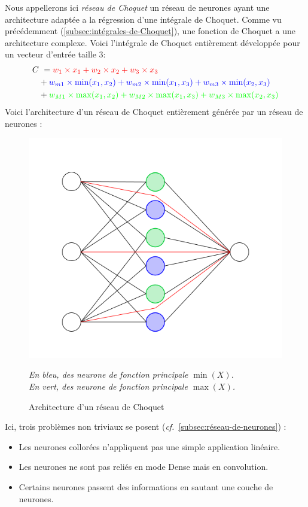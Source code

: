 Nous appellerons ici \emph{réseau de Choquet} un réseau de neurones ayant une architecture
adaptée a la régression d'une intégrale de Choquet.
Comme vu précédemment (\ref{subsec:intégrales-de-Choquet}),
une fonction de Choquet a une architecture complexe.
Voici l'intégrale de Choquet entièrement développée pour un vecteur d'entrée taille $3$:
\begin{align*}
    C&\ =
    \color{red}
    w_1 \times x_1 + w_2 \times x_2 + w_3 \times x_3 \\
    \color{black}
    & +
    \color{blue}
    w_{m1} \times \min(x_1, x_2) + w_{m2} \times \min(x_1, x_3) + w_{m3} \times \min(x_2, x_3) \\
    \color{black}
    & +
    \color{green}
    w_{M1} \times \max(x_1, x_2) + w_{M2} \times \max(x_1, x_3) + w_{M3} \times \max(x_2, x_3)
\end{align*}
Voici l'architecture d'un réseau de Choquet entièrement générée par un réseau de neurones :

\begin{figure}[H]
    \center
    \includegraphics[height=\moyen]{pict/chnet1}
	\caption{Architecture d'un réseau de Choquet}
	\label{fig:chnet1}
    \vspace{-10pt}
    \begin{center}
        \tiny
        \textit{
        En bleu, des neurone de fonction principale $\min(X)$. \\
        En vert, des neurone de fonction principale $\max(X)$.
        }
    \end{center}
\end{figure}
\vspace{-12pt}
Ici, trois problèmes non triviaux se posent (\textit{cf.}\ \ref{subsec:réseau-de-neurones}) :
\begin{itemize}
    \item Les neurones collorées n'appliquent pas une simple application linéaire.
    \item Les neurones ne sont pas reliés en mode Dense mais en convolution.
    \item Certains neurones passent des informations en sautant une couche de neurones.
\end{itemize}


